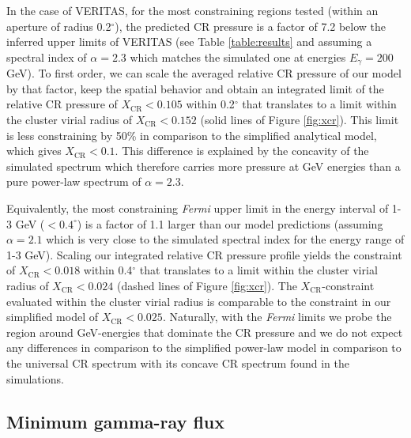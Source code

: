 \documentclass[12pt,manuscript]{aastex}
\def\Fermi{{\em Fermi}\xspace}
\newcommand{\CR}{\mathrm{CR}}
\begin{document}
In the case of VERITAS, for the most constraining regions tested (within an aperture of radius
0.2$^{\circ}$), the predicted CR pressure is a factor of 7.2 below the inferred upper limits of
VERITAS (see Table \ref{table:results} and assuming a spectral index of $\alpha=2.3$ which matches
the simulated one at energies $E_\gamma=200$ GeV). To first order, we can scale the averaged
relative CR pressure of our model by that factor, keep the spatial behavior and obtain an integrated
limit of the relative CR pressure of $X_{\CR}<0.105$ within 0.2$^{\circ}$ that translates to a limit
within the cluster virial radius of $X_\CR<0.152$ (solid lines of Figure \ref{fig:xcr}).  This limit
is less constraining by 50\% in comparison to the simplified analytical model, which gives
$X_\CR<0.1$. This difference is explained by the concavity of the simulated spectrum which therefore
carries more pressure at GeV energies than a pure power-law spectrum of $\alpha=2.3$.

Equivalently, the most constraining \Fermi upper limit in the energy interval of 1-3 GeV
($<0.4^\circ$) is a factor of 1.1 larger than our model predictions (assuming $\alpha=2.1$ which is
very close to the simulated spectral index for the energy range of 1-3 GeV). Scaling our integrated
relative CR pressure profile yields the constraint of $X_{\CR}<0.018$ within 0.4$^{\circ}$ that
translates to a limit within the cluster virial radius of $X_\CR<0.024$ (dashed lines of Figure
\ref{fig:xcr}).  The $X_\CR$-constraint evaluated within the cluster virial radius is comparable to
the constraint in our simplified model of $X_\CR<0.025$.  Naturally, with the \Fermi limits we probe
the region around GeV-energies that dominate the CR pressure and we do not expect any differences in
comparison to the simplified power-law model in comparison to the universal CR spectrum with its
concave CR spectrum found in the simulations.

%
%

\subsection{Minimum gamma-ray flux}
\label{sec:Fmin}
\end{document}
